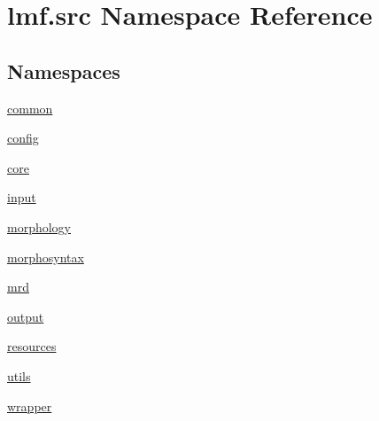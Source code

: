 \hypertarget{namespacelmf_1_1src}{\section{lmf.\+src Namespace Reference}
\label{namespacelmf_1_1src}
}
\subsection*{Namespaces}
\begin{DoxyCompactItemize}
\item 
 \hyperlink{namespacelmf_1_1src_1_1common}{common}
\item 
 \hyperlink{namespacelmf_1_1src_1_1config}{config}
\item 
 \hyperlink{namespacelmf_1_1src_1_1core}{core}
\item 
 \hyperlink{namespacelmf_1_1src_1_1input}{input}
\item 
 \hyperlink{namespacelmf_1_1src_1_1morphology}{morphology}
\item 
 \hyperlink{namespacelmf_1_1src_1_1morphosyntax}{morphosyntax}
\item 
 \hyperlink{namespacelmf_1_1src_1_1mrd}{mrd}
\item 
 \hyperlink{namespacelmf_1_1src_1_1output}{output}
\item 
 \hyperlink{namespacelmf_1_1src_1_1resources}{resources}
\item 
 \hyperlink{namespacelmf_1_1src_1_1utils}{utils}
\item 
 \hyperlink{namespacelmf_1_1src_1_1wrapper}{wrapper}
\end{DoxyCompactItemize}
